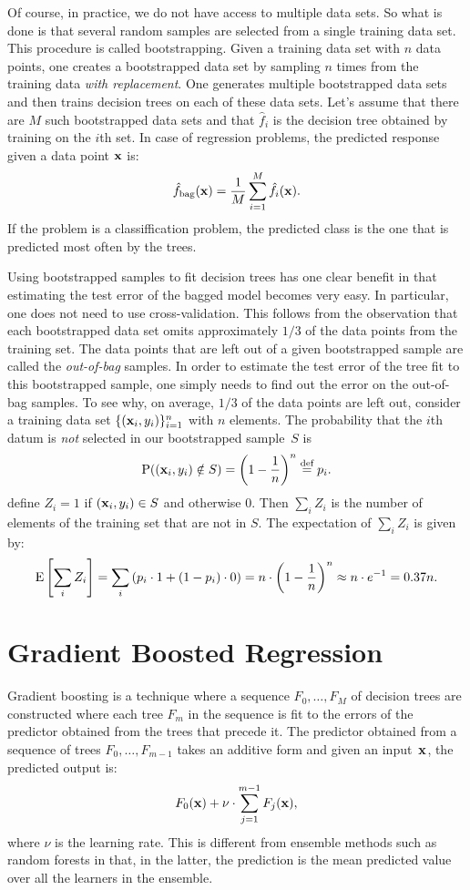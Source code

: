 Of course, in practice, we do not have access to multiple data sets. So what is 
done is that several random samples are selected from a single training data set. 
This procedure is called bootstrapping. Given a training data set with $n$ 
data points, one creates a bootstrapped data set by sampling $n$ times 
from the training data \emph{with replacement}. One generates multiple bootstrapped
data sets and then trains decision trees on each of these data sets. Let's 
assume that there are $M$ such bootstrapped data sets and that $\hat{f}_{i}$ 
is the decision tree obtained by training on the $i$th set. In case of regression
problems, the predicted response given a data point $\mathbf{x}$ is:
\[
    \hat{f}_{\text{bag}} (\mathbf{x}) = \frac{1}{M} \sum_{i = 1}^{M} \hat{f}_{i} (\mathbf{x}).
\]   
If the problem is a classiffication problem, the predicted class is the one that 
is predicted most often by the trees. 

Using bootstrapped samples to fit decision trees has one clear benefit in that 
estimating the test error of the bagged model becomes very easy. In particular, 
one does not need to use cross-validation. This follows from the observation 
that each bootstrapped data set omits approximately $1/3$ of the data points 
from the training set. The data points that are left out of a given bootstrapped sample are called 
the \emph{out-of-bag} samples. In order to estimate the test error of the 
tree fit to this bootstrapped sample, one simply needs to find out the error 
on the out-of-bag samples. To see why, on average, $1/3$ of the data points 
are left out, consider a training data set $\{(\mathbf{x}_i, y_i)\}_{i = 1}^{n}$ 
with $n$ elements. The probability that the $i$th datum is \emph{not} selected 
in our bootstrapped sample~$S$ is
\[
    \operatorname{P} ((\mathbf{x}_i, y_i) \notin S) = \left ( 1 - \frac{1}{n} \right )^{n} \stackrel{\text{def}}{=} p_i.
\]  
define $Z_i = 1$ if $(\mathbf{x}_i, y_i) \in S$ and otherwise $0$. Then 
$\sum_i Z_i$ is the number of elements of the training set that are not in $S$.
The expectation of $\sum_i Z_i$ is given by: 
\[
    \operatorname{E} \left [ \sum_i Z_i \right ] 
        = \sum_i \left ( p_i \cdot 1 + (1 - p_i) \cdot 0 \right ) 
        = n \cdot \left ( 1 - \frac{1}{n} \right )^{n} \approx n \cdot e^{-1}
        = 0.37 n.
\]

 
\chapter{Gradient Boosted Regression}

Gradient boosting is a technique where a sequence 
$F_0, \ldots, F_M$ of decision trees are constructed where 
each tree $F_m$ in the sequence is fit to the errors of the 
predictor obtained from the trees that precede it. The predictor obtained 
from a sequence of trees $F_0, \ldots, F_{m - 1}$ takes an additive 
form and given an input~$\mathbf{x}$, the predicted output is:
\begin{equation}
    F_0(\mathbf{x}) + \nu \cdot \sum_{j = 1}^{m - 1} F_j(\mathbf{x}),
\end{equation}  
where $\nu$ is the learning rate. This is different from ensemble methods 
such as random forests in that, in the latter, the prediction is the mean predicted 
value over all the learners in the ensemble. 

